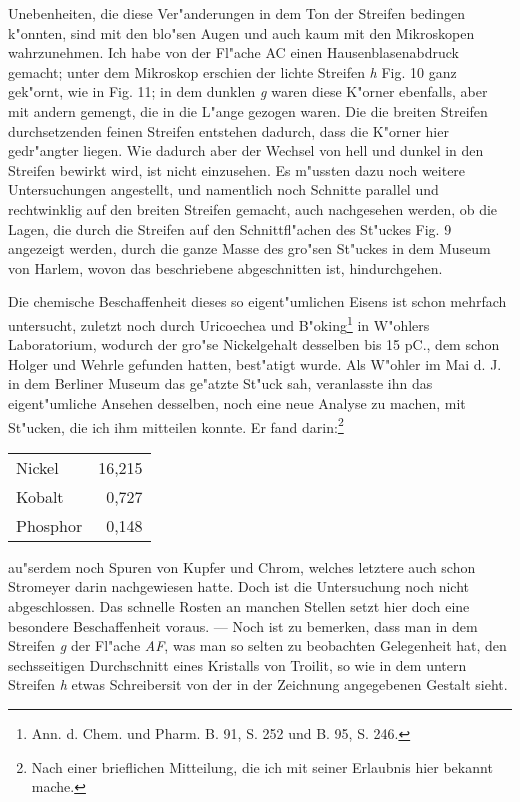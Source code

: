 \documentclass[a4paper, 11pt, oneside]{article}
\begin{document}
Unebenheiten, die diese Ver"anderungen in dem Ton der Streifen bedingen k"onnten, sind mit den blo"sen Augen und auch kaum mit den Mikroskopen wahrzunehmen. Ich habe von der Fl"ache AC einen Hausenblasenabdruck gemacht; unter dem Mikroskop erschien der lichte Streifen \emph{h} Fig. 10 ganz gek"ornt, wie in Fig. 11; in dem dunklen \emph{g} waren diese K"orner ebenfalls, aber mit andern gemengt, die in die L"ange gezogen waren. Die die breiten Streifen durchsetzenden feinen Streifen entstehen dadurch, dass die K"orner hier gedr"angter liegen. Wie dadurch aber der Wechsel von hell und dunkel in den Streifen bewirkt wird, ist nicht einzusehen. Es m"ussten dazu noch weitere Untersuchungen angestellt, und namentlich noch Schnitte parallel und rechtwinklig auf den breiten Streifen gemacht, auch nachgesehen werden, ob die Lagen, die durch die Streifen auf den Schnittfl"achen des St"uckes Fig. 9 angezeigt werden, durch die ganze Masse des gro"sen St"uckes in dem Museum von Harlem, wovon das beschriebene abgeschnitten ist, hindurchgehen.

Die chemische Beschaffenheit dieses so eigent"umlichen Eisens ist schon mehrfach untersucht, zuletzt noch durch Uricoechea und B"oking\footnote{Ann. d. Chem. und Pharm. B. 91, S. 252 und B. 95, S. 246.} in W"ohlers Laboratorium, wodurch der gro"se Nickelgehalt desselben bis 15 pC., dem schon Holger und Wehrle gefunden hatten, best"atigt wurde. Als W"ohler im Mai d. J. in dem Berliner Museum das ge"atzte St"uck sah, veranlasste ihn das eigent"umliche Ansehen desselben, noch eine neue Analyse zu machen, mit St"ucken, die ich ihm mitteilen konnte. Er fand darin:\footnote{Nach einer brieflichen Mitteilung, die ich mit seiner Erlaubnis hier bekannt mache.}
\begin{center}
\begin{tabular}{ l r }
    Nickel & 16,215\\
    Kobalt & 0,727\\
    Phosphor & 0,148\\
\end{tabular}
\end{center}
au"serdem noch Spuren von Kupfer und Chrom, welches letztere auch schon Stromeyer darin nachgewiesen hatte. Doch ist die Untersuchung noch nicht abgeschlossen. Das schnelle Rosten an manchen Stellen setzt hier doch eine besondere Beschaffenheit voraus. --- Noch ist zu bemerken, dass man in dem Streifen \emph{g} der Fl"ache \emph{AF}, was man so selten zu beobachten Gelegenheit hat, den sechsseitigen Durchschnitt eines Kristalls von Troilit, so wie in dem untern Streifen \emph{h} etwas Schreibersit von der in der Zeichnung angegebenen Gestalt sieht.
\end{document}

